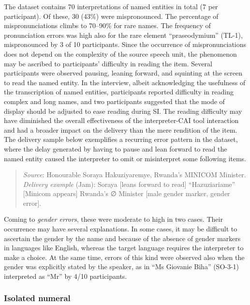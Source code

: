 The dataset contains 70 interpretations of named entities in total (7 per participant). Of these, 30 (43\%) were mispronounced. The percentage of mispronunciations climbs to 70--90\% for rare names. The frequency of pronunciation errors was high also for the rare element ``praseodymium'' (TL-1), mispronounced by 3 of 10 participants. Since the occurrence of mispronunciations does not depend on the complexity of the source speech unit, the phenomenon may be ascribed to participants’ difficulty in reading the item. Several participants were observed pausing, leaning forward, and squinting at the screen to read the named entity. In the interview, albeit acknowledging the usefulness of the transcription of named entities, participants reported difficulty in reading complex and long names, and two participants suggested that the mode of display should be adjusted to ease reading during SI. The reading difficulty may have diminished the overall effectiveness of the interpreter-CAI tool interaction and had a broader impact on the delivery than the mere rendition of the item. The delivery sample below exemplifies a recurring error pattern in the dataset, where the delay generated by having to pause and lean forward to read the named entity caused the interpreter to omit or misinterpret some following items.
\begin{quote}
\begin{sloppypar}
    \textit{Source}: Honourable Soraya Hakuziyaremye, Rwanda's MINICOM Minister.\\
\textit{Delivery example} (Jam): Soraya [leans forward to read] ``Hazuziariame'' [Minicom appears] Rwanda’s ∅ Minister [male gender marker, gender error].
\end{sloppypar}
\end{quote}
Coming to \textit{gender errors}, these were moderate to high in two cases. Their occurrence may have several explanations. In some cases, it may be difficult to ascertain the gender by the name and because of the absence of gender markers in languages like English, whereas the target language requires the interpreter to make a choice. At the same time, errors of this kind were observed also when the gender was explicitly stated by the speaker, as in ``Ms Giovanie Biha'' (SO-3-1) interpreted as ``Mr'' by 4/10 participants.



\subsubsection{Isolated numeral}

